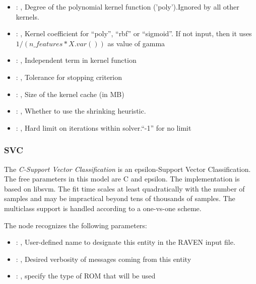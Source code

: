 \begin{itemize}
    \item {}: , 
      Degree of the polynomial kernel function ('poly').Ignored by all other kernels.

    \item {}: , 
      Kernel coefficient for ``poly'', ``rbf'' or ``sigmoid''. If not input, then it uses
      $1 / (n\_features * X.var())$ as value of gamma

    \item {}: , 
      Independent term in kernel function

    \item {}: , 
      Tolerance for stopping criterion

    \item {}: , 
      Size of the kernel cache (in MB)

    \item {}: , 
      Whether to use the shrinking heuristic.

    \item {}: , 
      Hard limit on iterations within solver.``-1'' for no limit
  \end{itemize}


\subsubsection{SVC}
  The  \textit{C-Support Vector Classification} is an epsilon-Support Vector
  Classification.                             The free parameters in this model are C and epsilon.
  The implementation is based on libsvm. The fit time scales at least
  quadratically with the number of samples and may be impractical                             beyond
  tens of thousands of samples. The multiclass support is handled according to a one-vs-one scheme.

  The  node recognizes the following parameters:
    \begin{itemize}
      \item {}: , 
        User-defined name to designate this entity in the RAVEN input file.
      \item {}: , 
        Desired verbosity of messages coming from this entity
      \item {}: , 
        specify the type of ROM that will be used
  \end{itemize}

